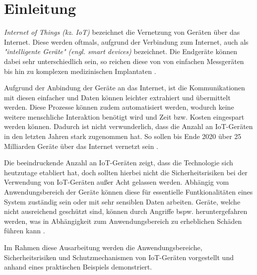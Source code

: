 \section{Einleitung}
\textit{Internet of Things (kz. IoT)} bezeichnet die Vernetzung von Geräten
über das Internet.  Diese werden oftmals, aufgrund der Verbindung zum Internet,
auch als \textit{"intelligente Geräte" (engl. smart devices)} bezeichnet. Die
Endgeräte können dabei sehr unterschiedlich sein, so reichen diese von von
einfachen Messgeräten bis hin zu komplexen medizinischen Implantaten
\cite{paper}.

Aufgrund der Anbindung der Geräte an das Internet, ist die Kommunikationen mit
diesen einfacher und Daten können leichter extrahiert und übermittelt werden.
Diese Prozesse können zudem automatisiert werden, wodurch keine weitere
menschliche Interaktion benötigt wird und Zeit bzw. Kosten eingespart werden
können. Dadurch ist nicht verwunderlich, dass die Anzahl an IoT-Geräten in den
letzten Jahren stark zugenommen hat. So sollen bis Ende 2020 über 25 Milliarden
Geräte über das Internet vernetzt sein \cite{paper}.

Die beeindruckende Anzahl an IoT-Geräten zeigt, dass die Technologie sich
heutzutage etabliert hat, doch sollten hierbei nicht die Sicherheitsrisiken bei
der Verwendung von IoT-Geräten außer Acht gelassen werden. Abhängig vom
Anwendungsbereich der Geräte können diese für essentielle Funtkionalitäten eines
System zuständig sein oder mit sehr sensiblen Daten arbeiten.  Geräte, welche
nicht ausreichend geschützt sind, können durch Angriffe bspw.  heruntergefahren
werden, was in Abhängigkeit zum Anwendungsbereich zu erheblichen Schäden führen
kann \cite{paper}.

Im Rahmen diese Ausarbeitung werden die Anwendungsbereiche, Sicherheitsrisiken
und Schutzmechanismen von IoT-Geräten vorgestellt und anhand eines praktischen
Beispiels demonstriert.
